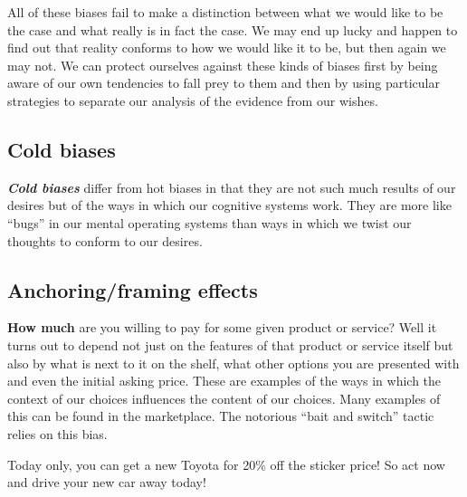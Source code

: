 \documentclass[12pt, openany]{book}
\begin{document}
All of these biases fail to make a distinction between what we would like to be the case and what really is in fact the case. We may end up lucky and happen to find out that reality conforms to how we would like it to be, but then again we may not. We can protect ourselves against these kinds of biases first by being aware of our own tendencies to fall prey to them and then by using particular strategies to separate our analysis of the evidence from our wishes.

\hypertarget{cold-biases}{%
\subsection*{\texorpdfstring{\textbf{Cold biases}}{Cold biases}}\label{cold-biases}}


\textbf{\emph{Cold biases}} differ from hot biases in that they are not such much results of our desires but of the ways in which our cognitive systems work. They are more like ``bugs'' in our mental operating systems than ways in which we twist our thoughts to conform to our desires.

\hypertarget{anchoringframing-effects}{%
\subsection*{Anchoring/framing effects}\label{anchoringframing-effects}}


\textbf{How much} are you willing to pay for some given product or service? Well it turns out to depend not just on the features of that product or service itself but also by what is next to it on the shelf, what other options you are presented with and even the initial asking price. These are examples of the ways in which the context of our choices influences the content of our choices. Many examples of this can be found in the marketplace. The notorious ``bait and switch'' tactic relies on this bias.

\begin{center}

\begin{argument}

Today only, you can get a new Toyota for 20\% off the sticker price! So act now and drive your new car away today!

\end{argument}

\end{center}
\end{document}
